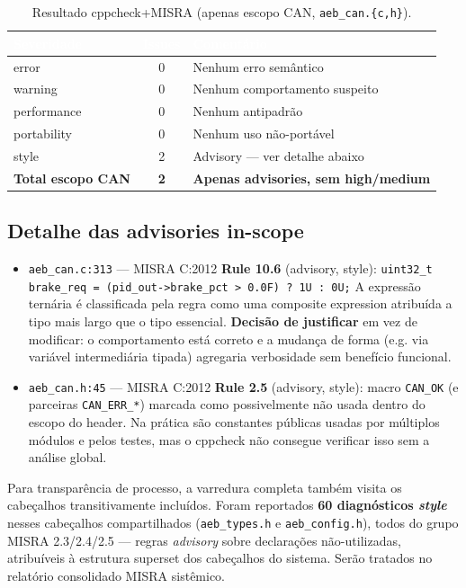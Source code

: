 \documentclass[12pt]{article}
\begin{document}
\begin{table}[H]
\centering
\caption{Resultado cppcheck+MISRA (apenas escopo CAN, \texttt{aeb\_can.\{c,h\}}).}
\footnotesize
\begin{tabular}{|l|c|l|}
\hline
\rowcolor{sectionblue}
\textcolor{white}{\textbf{Severidade}} &
\textcolor{white}{\textbf{Issues}} &
\textcolor{white}{\textbf{Comentário}} \\ \hline
error       & 0 & Nenhum erro semântico \\ \hline
warning     & 0 & Nenhum comportamento suspeito \\ \hline
performance & 0 & Nenhum antipadrão \\ \hline
portability & 0 & Nenhum uso não-portável \\ \hline
style       & 2 & Advisory --- ver detalhe abaixo \\ \hline
\textbf{Total escopo CAN} & \textbf{2} & \textbf{Apenas advisories, sem high/medium} \\ \hline
\end{tabular}
\end{table}

\subsection{Detalhe das advisories in-scope}

\begin{itemize}[leftmargin=1.2em, itemsep=4pt]
\item \texttt{aeb\_can.c:313} --- MISRA C:2012 \textbf{Rule 10.6} (advisory, style):
      \texttt{uint32\_t brake\_req = (pid\_out->brake\_pct > 0.0F) ? 1U : 0U;}
      A expressão ternária é classificada pela regra como uma composite expression atribuída a tipo
      mais largo que o tipo essencial. \textbf{Decisão de justificar} em vez de modificar: o
      comportamento está correto e a mudança de forma (e.g. via variável intermediária tipada)
      agregaria verbosidade sem benefício funcional.
\item \texttt{aeb\_can.h:45} --- MISRA C:2012 \textbf{Rule 2.5} (advisory, style):
      macro \texttt{CAN\_OK} (e parceiras \texttt{CAN\_ERR\_*}) marcada como possivelmente não usada
      dentro do escopo do header. Na prática são constantes públicas usadas por múltiplos módulos e
      pelos testes, mas o cppcheck não consegue verificar isso sem a análise global.
\end{itemize}

Para transparência de processo, a varredura completa também visita os cabeçalhos transitivamente
incluídos. Foram reportados \textbf{60 diagnósticos \textit{style}} nesses cabeçalhos compartilhados
(\texttt{aeb\_types.h} e \texttt{aeb\_config.h}), todos do grupo MISRA 2.3/2.4/2.5 --- regras
\textit{advisory} sobre declarações não-utilizadas, atribuíveis à estrutura superset dos cabeçalhos
do sistema. Serão tratados no relatório consolidado MISRA sistêmico.
\end{document}
